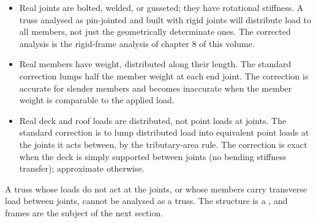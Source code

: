 \begin{itemize}[leftmargin=*]
  \item Real joints are bolted, welded, or gusseted; they have
    rotational stiffness. A truss analysed as pin-jointed and built
    with rigid joints will distribute load to all members, not just
    the geometrically determinate ones. The corrected analysis is
    the rigid-frame analysis of chapter 8 of this volume.
  \item Real members have weight, distributed along their length.
    The standard correction lumps half the member weight at each
    end joint. The correction is accurate for slender members and
    becomes inaccurate when the member weight is comparable to the
    applied load.
  \item Real deck and roof loads are distributed, not point loads
    at joints. The standard correction is to lump distributed load
    into equivalent point loads at the joints it acts between, by
    the tributary-area rule. The correction is exact when the deck
    is simply supported between joints (no bending stiffness
    transfer); approximate otherwise.
\end{itemize}

A truss whose loads do not act at the joints, or whose members
carry transverse load between joints, cannot be analysed as a truss.
The structure is a , and frames are the subject of
the next section.


